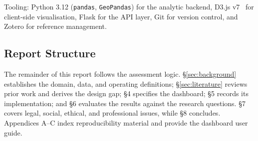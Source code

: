 Tooling: Python 3.12 (\texttt{pandas}, \texttt{GeoPandas}) for the analytic backend, D3.js v7~\cite{bostock2011} for client-side visualisation, Flask for the API layer, Git for version control, and Zotero for reference management.

\subsection{Report Structure}

The remainder of this report follows the assessment logic. \S\ref{sec:background} establishes the domain, data, and operating definitions; \S\ref{sec:literature} reviews prior work and derives the design gap; \S4 specifies the dashboard; \S5 records its implementation; and \S6 evaluates the results against the research questions. \S7 covers legal, social, ethical, and professional issues, while \S8 concludes. Appendices A--C index reproducibility material and provide the dashboard user guide.
